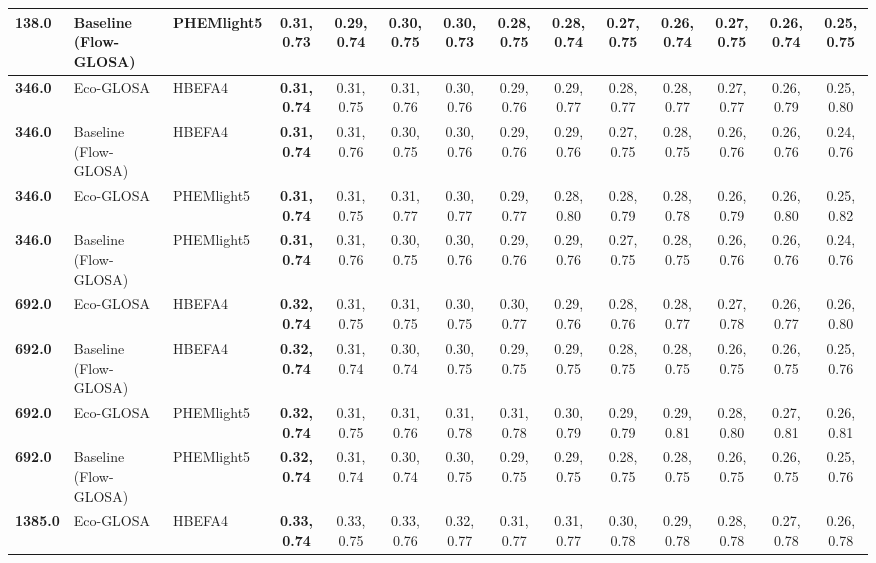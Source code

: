 \begin{table}[htb]
{\begin{tabular}{l l l *{11}{c}}
      \textbf{138.0} & Baseline (Flow-GLOSA)       & PHEMlight5  & \textbf{0.31, 0.73}  & 0.29, 0.74  & 0.30, 0.75  & 0.30, 0.73  & 0.28, 0.75  & 0.28, 0.74  & 0.27, 0.75  & 0.26, 0.74  & 0.27, 0.75  & 0.26, 0.74  & 0.25, 0.75  \\
      \midrule
      \textbf{346.0} & Eco-GLOSA                   & HBEFA4      & \textbf{0.31, 0.74}  & 0.31, 0.75  & 0.31, 0.76  & 0.30, 0.76  & 0.29, 0.76  & 0.29, 0.77  & 0.28, 0.77  & 0.28, 0.77  & 0.27, 0.77  & 0.26, 0.79  & 0.25, 0.80  \\
      \textbf{346.0} & Baseline (Flow-GLOSA)       & HBEFA4      & \textbf{0.31, 0.74}  & 0.31, 0.76  & 0.30, 0.75  & 0.30, 0.76  & 0.29, 0.76  & 0.29, 0.76  & 0.27, 0.75  & 0.28, 0.75  & 0.26, 0.76  & 0.26, 0.76  & 0.24, 0.76  \\
      \textbf{346.0} & Eco-GLOSA                   & PHEMlight5  & \textbf{0.31, 0.74}  & 0.31, 0.75  & 0.31, 0.77  & 0.30, 0.77  & 0.29, 0.77  & 0.28, 0.80  & 0.28, 0.79  & 0.28, 0.78  & 0.26, 0.79  & 0.26, 0.80  & 0.25, 0.82  \\
      \textbf{346.0} & Baseline (Flow-GLOSA)       & PHEMlight5  & \textbf{0.31, 0.74}  & 0.31, 0.76  & 0.30, 0.75  & 0.30, 0.76  & 0.29, 0.76  & 0.29, 0.76  & 0.27, 0.75  & 0.28, 0.75  & 0.26, 0.76  & 0.26, 0.76  & 0.24, 0.76  \\
      \midrule
      \textbf{692.0} & Eco-GLOSA                   & HBEFA4      & \textbf{0.32, 0.74}  & 0.31, 0.75  & 0.31, 0.75  & 0.30, 0.75  & 0.30, 0.77  & 0.29, 0.76  & 0.28, 0.76  & 0.28, 0.77  & 0.27, 0.78  & 0.26, 0.77  & 0.26, 0.80  \\
      \textbf{692.0} & Baseline (Flow-GLOSA)       & HBEFA4      & \textbf{0.32, 0.74}  & 0.31, 0.74  & 0.30, 0.74  & 0.30, 0.75  & 0.29, 0.75  & 0.29, 0.75  & 0.28, 0.75  & 0.28, 0.75  & 0.26, 0.75  & 0.26, 0.75  & 0.25, 0.76  \\
      \textbf{692.0} & Eco-GLOSA                   & PHEMlight5  & \textbf{0.32, 0.74}  & 0.31, 0.75  & 0.31, 0.76  & 0.31, 0.78  & 0.31, 0.78  & 0.30, 0.79  & 0.29, 0.79  & 0.29, 0.81  & 0.28, 0.80  & 0.27, 0.81  & 0.26, 0.81  \\
      \textbf{692.0} & Baseline (Flow-GLOSA)       & PHEMlight5  & \textbf{0.32, 0.74}  & 0.31, 0.74  & 0.30, 0.74  & 0.30, 0.75  & 0.29, 0.75  & 0.29, 0.75  & 0.28, 0.75  & 0.28, 0.75  & 0.26, 0.75  & 0.26, 0.75  & 0.25, 0.76  \\
      \midrule
      \textbf{1385.0}& Eco-GLOSA                   & HBEFA4      & \textbf{0.33, 0.74}  & 0.33, 0.75  & 0.33, 0.76  & 0.32, 0.77  & 0.31, 0.77  & 0.31, 0.77  & 0.30, 0.78  & 0.29, 0.78  & 0.28, 0.78  & 0.27, 0.78  & 0.26, 0.78  \\

\end{tabular}}
\end{table}
